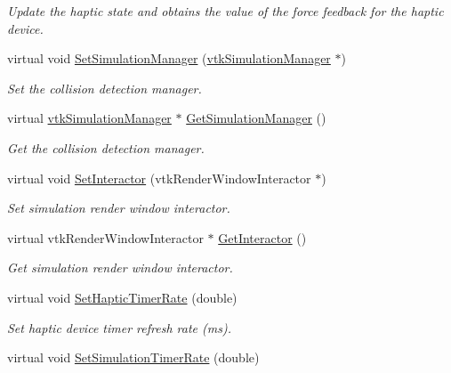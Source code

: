 \begin{DoxyCompactItemize}
\begin{DoxyCompactList}\small\item\em Update the haptic state and obtains the value of the force feedback for the haptic device. \item\end{DoxyCompactList}\item 
virtual void \hyperlink{classvtkSimulation_a244662f687e733e277feaf5c7dcdae6c}{SetSimulationManager} (\hyperlink{classvtkSimulationManager}{vtkSimulationManager} $\ast$)
\begin{DoxyCompactList}\small\item\em Set the collision detection manager. \item\end{DoxyCompactList}\item 
virtual \hyperlink{classvtkSimulationManager}{vtkSimulationManager} $\ast$ \hyperlink{classvtkSimulation_a5f70409301819a5e0f725c49c1a6207f}{GetSimulationManager} ()
\begin{DoxyCompactList}\small\item\em Get the collision detection manager. \item\end{DoxyCompactList}\item 
virtual void \hyperlink{classvtkSimulation_ac735eaac690e6ca27d5c64131f495a26}{SetInteractor} (vtkRenderWindowInteractor $\ast$)
\begin{DoxyCompactList}\small\item\em Set simulation render window interactor. \item\end{DoxyCompactList}\item 
virtual vtkRenderWindowInteractor $\ast$ \hyperlink{classvtkSimulation_a80ce57f6226a646fd8faf2fac1767a64}{GetInteractor} ()
\begin{DoxyCompactList}\small\item\em Get simulation render window interactor. \item\end{DoxyCompactList}\item 
\hypertarget{classvtkSimulation_a7b94e72e6f1d932f02d490febc08f74e}{
virtual void \hyperlink{classvtkSimulation_a7b94e72e6f1d932f02d490febc08f74e}{SetHapticTimerRate} (double)}
\label{classvtkSimulation_a7b94e72e6f1d932f02d490febc08f74e}

\begin{DoxyCompactList}\small\item\em Set haptic device timer refresh rate (ms). \item\end{DoxyCompactList}\item 
\hypertarget{classvtkSimulation_ac9638ca6fb692f219ed03bcded1bad99}{
virtual void \hyperlink{classvtkSimulation_ac9638ca6fb692f219ed03bcded1bad99}{SetSimulationTimerRate} (double)}
\label{classvtkSimulation_ac9638ca6fb692f219ed03bcded1bad99}


\end{DoxyCompactItemize}
